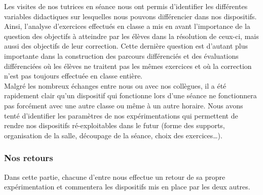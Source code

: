 Les visites de nos tutrices en séance nous ont permis d'identifier les différentes variables didactiques sur lesquelles nous pouvons différencier dans nos dispositifs. Ainsi, l'analyse d'exercices effectués en classe a mis en avant l'importance de la question des objectifs à atteindre par les élèves dans la résolution de ceux-ci, mais aussi des objectifs de leur correction. Cette dernière question est d'autant plus importante dans la construction des parcours différenciés et des évaluations différenciées où les élèves ne traitent pas les mêmes exercices et où la correction n'est pas toujours effectuée en classe entière.\\
Malgré les nombreux échanges entre nous ou avec nos collègues, il a été rapidement clair qu'un dispositif qui fonctionne lors d'une séance ne fonctionnera pas forcément avec une autre classe ou même à un autre horaire. Nous avons tenté d'identifier les paramètres de nos expérimentations qui permettent de rendre nos dispositifs ré-exploitables dans le futur (forme des supports, organisation de la salle, découpage de la séance, choix des exercices\ldots).

\subsubsection{Nos retours}\label{sec:retours}
Dans cette partie, chacune d'entre nous effectue un retour de sa propre expérimentation et commentera les dispositifs mis en place par les deux autres. \\
